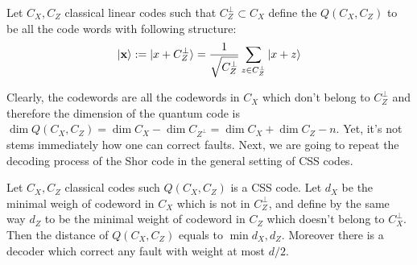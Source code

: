 \ifdefined\CSSDOC

\fi 


\begin{definition}
  Let $C_{X}, C_{Z}$ classical linear codes such that $C_{Z}^{\perp} \subset C_{X}$ define the $Q\left( C_{X},C_{Z} \right)$ to be all the code words with following structure:
  \begin{equation*}
    \begin{split}
    \ket { \mathbf{ x } } := \ket { x + C_{Z}^{\perp} } = \frac{1}{\sqrt{C_{Z}^{\perp}}} \sum_{z \in C_{Z}^{\perp}}{ \ket{ x + z }} 
    \end{split}
  \end{equation*}
\end{definition}
Clearly, the codewords are all the codewords in $C_{X}$ which don't belong to $C_{Z}^{\perp}$ and therefore the dimension of the quantum code is $\dim Q\left( C_{X}, C_{Z} \right) = \dim C_{X} - \dim C_{Z^{\perp}} = \dim C_{X} + \dim C_{Z} - n$. Yet, it's not stems immediately how one can correct faults. Next, we are going to repeat the decoding process of the Shor code in the general setting of CSS codes.  
\begin{lemma}
  Let $C_{X},C_{Z}$ classical codes such $Q\left( C_{X},C_{Z} \right)$ is a CSS code. Let $d_{X}$ be the minimal weigh of codeword in $C_{X}$ which is not in $C_{Z}^{\perp}$, and define by the same way $d_{Z}$ to be the minimal weight of codeword in $C_{Z}$ which doesn't belong to $C_{X}^{\perp}$. Then the distance of $Q\left( C_{X},C_{Z} \right)$ equals to $\min{d_{X},d_{Z}}$. Moreover there is a decoder which correct any fault with weight at most $d/2$.       
  \end{lemma}

